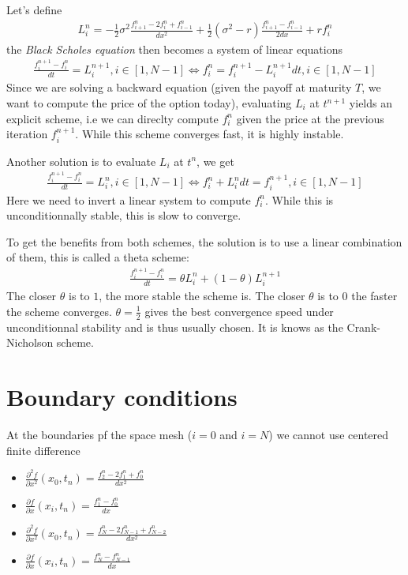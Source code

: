 \documentclass[a4paper]{article}
\begin{document}
Let's define
\begin{gather*}L_i^n = -\frac{1}{2}\sigma^2\frac{f_{i+1}^n - 2 f_i^n + f_{i-1}^n}{dx^2} + \frac{1}{2}(\sigma^2 - r)  \frac{f_{i+1}^n - f_{i-1}^n}{2dx} + rf_i^n
\end{gather*}  the \textit{Black Scholes equation} then becomes a system of linear equations
\begin{gather*}
\frac{f_i^{n+1} - f_i^{n}}{dt} = L_i^{n+1}, i \in [1, N-1] \Longleftrightarrow
f_i^n = f_i^{n+1} - L_i^{n+1}dt, i \in [1, N-1]
\end{gather*}
Since we are solving a backward equation (given the payoff at maturity $T$, we want to compute the price of the option today), evaluating $L_i$ 
at $t^{n+1}$ yields an explicit scheme, i.e we can direclty compute $f_i^n$ given the price at the previous iteration $f_i^{n+1}$. While this scheme
converges fast, it is highly instable.

Another solution is to evaluate $L_i$ at $t^n$, we get
\begin{gather*}
\frac{f_i^{n+1} - f_i^{n}}{dt} = L_i^{n}, i \in [1, N-1] \Longleftrightarrow
f_i^n + L_i^n dt = f_i^{n+1}, i \in [1, N-1]
\end{gather*}
Here we need to invert a linear system to compute $f_i^n$. While this is unconditionnally stable, this is slow to converge.

To get the benefits from both schemes, the solution is to use a linear combination of them, this is called a theta scheme:
\begin{gather*}
\frac{f_i^{n+1} - f_i^{n}}{dt} = \theta L_i^n + (1-\theta) L_i^{n+1}
\end{gather*}
The closer $\theta$ is to $1$, the more stable the scheme is. The closer $\theta$ is to $0$ the faster the scheme converges. $\theta = \frac{1}{2}$ gives
the best convergence speed under unconditionnal stability and is thus usually chosen. It is knows as the Crank-Nicholson scheme.

\section{Boundary conditions}

At the boundaries pf the space mesh ($i = 0$ and $i = N$) we cannot use centered finite difference
\begin{itemize}
\item $\frac{\partial^2 f}{\partial x^2}(x_0, t_n) = \frac{f_{2}^n - 2f_{1}^n + f_{0}^n}{dx^2}$
\item $\frac{\partial f}{\partial x}(x_i, t_n) = \frac{f_{1}^n - f_{0}^n}{dx}$
\item $\frac{\partial^2 f}{\partial x^2}(x_0, t_n) = \frac{f_{N}^n - 2f_{N-1}^n + f_{N-2}^n}{dx^2}$
\item $\frac{\partial f}{\partial x}(x_i, t_n) = \frac{f_{N}^n - f_{N-1}^n}{dx}$
\end{itemize}
\end{document}
